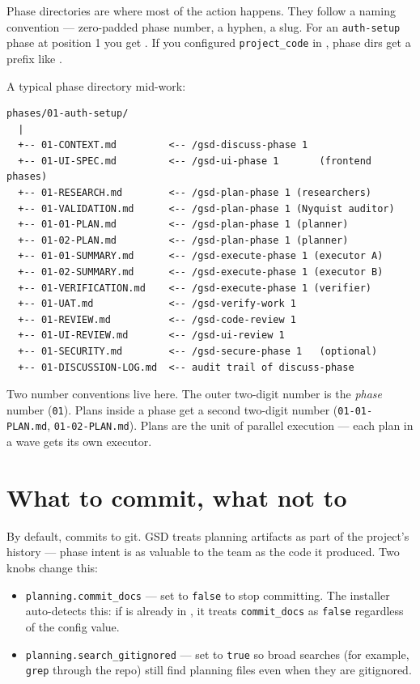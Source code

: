 \documentclass[11pt,letterpaper,openany]{book}
\begin{document}
Phase directories are where most of the action happens. They follow a naming convention --- zero-padded phase number, a hyphen, a slug. For an \texttt{auth-setup} phase at position 1 you get . If you configured \texttt{project\_code} in , phase dirs get a prefix like .

A typical phase directory mid-work:

\begin{lstlisting}[style=gsddiagram]
  phases/01-auth-setup/
  |
  +-- 01-CONTEXT.md         <-- /gsd-discuss-phase 1
  +-- 01-UI-SPEC.md         <-- /gsd-ui-phase 1       (frontend phases)
  +-- 01-RESEARCH.md        <-- /gsd-plan-phase 1 (researchers)
  +-- 01-VALIDATION.md      <-- /gsd-plan-phase 1 (Nyquist auditor)
  +-- 01-01-PLAN.md         <-- /gsd-plan-phase 1 (planner)
  +-- 01-02-PLAN.md         <-- /gsd-plan-phase 1 (planner)
  +-- 01-01-SUMMARY.md      <-- /gsd-execute-phase 1 (executor A)
  +-- 01-02-SUMMARY.md      <-- /gsd-execute-phase 1 (executor B)
  +-- 01-VERIFICATION.md    <-- /gsd-execute-phase 1 (verifier)
  +-- 01-UAT.md             <-- /gsd-verify-work 1
  +-- 01-REVIEW.md          <-- /gsd-code-review 1
  +-- 01-UI-REVIEW.md       <-- /gsd-ui-review 1
  +-- 01-SECURITY.md        <-- /gsd-secure-phase 1   (optional)
  +-- 01-DISCUSSION-LOG.md  <-- audit trail of discuss-phase
\end{lstlisting}

Two number conventions live here. The outer two-digit number is the \emph{phase} number (\texttt{01}). Plans inside a phase get a second two-digit number (\texttt{01-01-PLAN.md}, \texttt{01-02-PLAN.md}). Plans are the unit of parallel execution --- each plan in a wave gets its own executor.

\section{What to commit, what not to}

By default,  commits to git. GSD treats planning artifacts as part of the project's history --- phase intent is as valuable to the team as the code it produced. Two knobs change this:

\begin{itemize}[itemsep=2pt]
  \item \texttt{planning.commit\_docs} --- set to \texttt{false} to stop committing. The installer auto-detects this: if  is already in , it treats \texttt{commit\_docs} as \texttt{false} regardless of the config value.
  \item \texttt{planning.search\_gitignored} --- set to \texttt{true} so broad searches (for example, \texttt{grep} through the repo) still find planning files even when they are gitignored.
\end{itemize}
\end{document}
